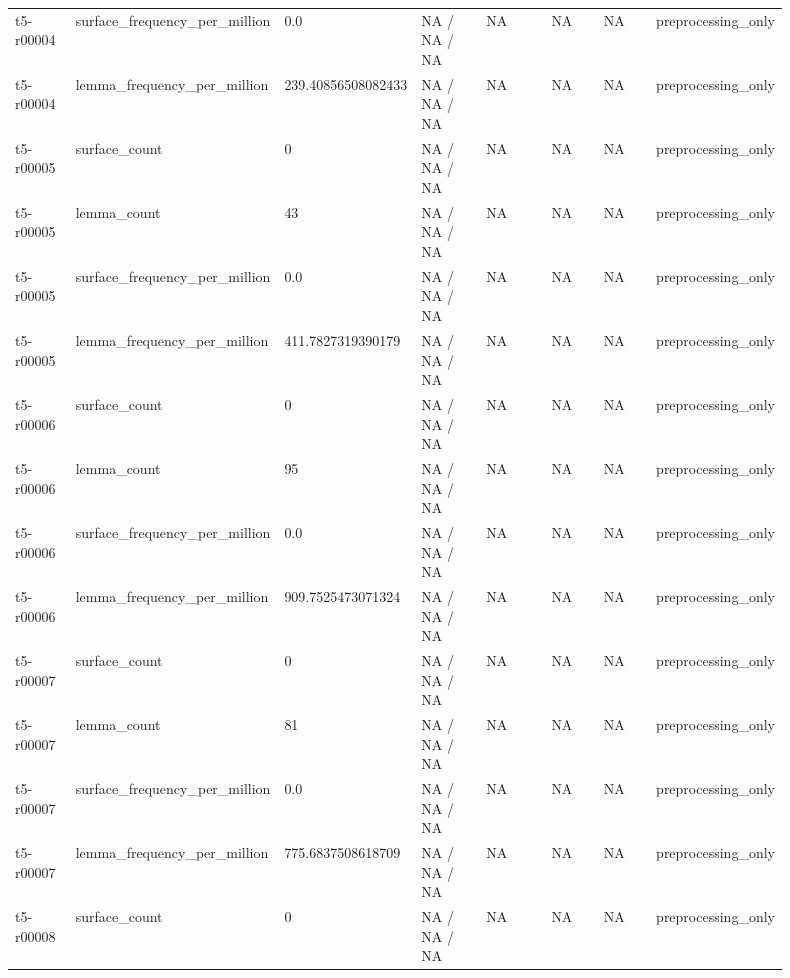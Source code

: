 \begin{longtable}{@{}p{0.09\linewidth}p{0.14\linewidth}p{0.08\linewidth}p{0.14\linewidth}p{0.14\linewidth}p{0.1\linewidth}p{0.1\linewidth}p{0.11\linewidth}@{}}
t5-r00004 & surface\_\allowbreak{}frequency\_\allowbreak{}per\_\allowbreak{}million & 0.0 & NA / NA / NA & NA & NA & NA & preprocessing\_\allowbreak{}only \\
t5-r00004 & lemma\_\allowbreak{}frequency\_\allowbreak{}per\_\allowbreak{}million & 239.40856508082433 & NA / NA / NA & NA & NA & NA & preprocessing\_\allowbreak{}only \\
t5-r00005 & surface\_\allowbreak{}count & 0 & NA / NA / NA & NA & NA & NA & preprocessing\_\allowbreak{}only \\
t5-r00005 & lemma\_\allowbreak{}count & 43 & NA / NA / NA & NA & NA & NA & preprocessing\_\allowbreak{}only \\
t5-r00005 & surface\_\allowbreak{}frequency\_\allowbreak{}per\_\allowbreak{}million & 0.0 & NA / NA / NA & NA & NA & NA & preprocessing\_\allowbreak{}only \\
t5-r00005 & lemma\_\allowbreak{}frequency\_\allowbreak{}per\_\allowbreak{}million & 411.7827319390179 & NA / NA / NA & NA & NA & NA & preprocessing\_\allowbreak{}only \\
t5-r00006 & surface\_\allowbreak{}count & 0 & NA / NA / NA & NA & NA & NA & preprocessing\_\allowbreak{}only \\
t5-r00006 & lemma\_\allowbreak{}count & 95 & NA / NA / NA & NA & NA & NA & preprocessing\_\allowbreak{}only \\
t5-r00006 & surface\_\allowbreak{}frequency\_\allowbreak{}per\_\allowbreak{}million & 0.0 & NA / NA / NA & NA & NA & NA & preprocessing\_\allowbreak{}only \\
t5-r00006 & lemma\_\allowbreak{}frequency\_\allowbreak{}per\_\allowbreak{}million & 909.7525473071324 & NA / NA / NA & NA & NA & NA & preprocessing\_\allowbreak{}only \\
t5-r00007 & surface\_\allowbreak{}count & 0 & NA / NA / NA & NA & NA & NA & preprocessing\_\allowbreak{}only \\
t5-r00007 & lemma\_\allowbreak{}count & 81 & NA / NA / NA & NA & NA & NA & preprocessing\_\allowbreak{}only \\
t5-r00007 & surface\_\allowbreak{}frequency\_\allowbreak{}per\_\allowbreak{}million & 0.0 & NA / NA / NA & NA & NA & NA & preprocessing\_\allowbreak{}only \\
t5-r00007 & lemma\_\allowbreak{}frequency\_\allowbreak{}per\_\allowbreak{}million & 775.6837508618709 & NA / NA / NA & NA & NA & NA & preprocessing\_\allowbreak{}only \\
t5-r00008 & surface\_\allowbreak{}count & 0 & NA / NA / NA & NA & NA & NA & preprocessing\_\allowbreak{}only \\

\end{longtable}
